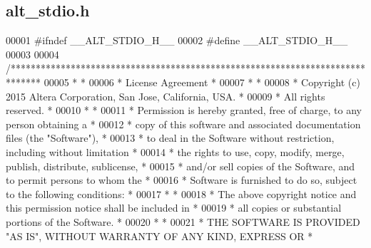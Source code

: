 \subsection{alt\+\_\+stdio.\+h}
\label{alt__stdio_8h_source}

\begin{DoxyCode}
00001 \textcolor{preprocessor}{#ifndef \_\_ALT\_STDIO\_H\_\_}
00002 \textcolor{preprocessor}{#define \_\_ALT\_STDIO\_H\_\_}
00003 
00004 \textcolor{comment}{/******************************************************************************}
00005 \textcolor{comment}{*                                                                             *}
00006 \textcolor{comment}{* License Agreement                                                           *}
00007 \textcolor{comment}{*                                                                             *}
00008 \textcolor{comment}{* Copyright (c) 2015 Altera Corporation, San Jose, California, USA.           *}
00009 \textcolor{comment}{* All rights reserved.                                                        *}
00010 \textcolor{comment}{*                                                                             *}
00011 \textcolor{comment}{* Permission is hereby granted, free of charge, to any person obtaining a     *}
00012 \textcolor{comment}{* copy of this software and associated documentation files (the "Software"),  *}
00013 \textcolor{comment}{* to deal in the Software without restriction, including without limitation   *}
00014 \textcolor{comment}{* the rights to use, copy, modify, merge, publish, distribute, sublicense,    *}
00015 \textcolor{comment}{* and/or sell copies of the Software, and to permit persons to whom the       *}
00016 \textcolor{comment}{* Software is furnished to do so, subject to the following conditions:        *}
00017 \textcolor{comment}{*                                                                             *}
00018 \textcolor{comment}{* The above copyright notice and this permission notice shall be included in  *}
00019 \textcolor{comment}{* all copies or substantial portions of the Software.                         *}
00020 \textcolor{comment}{*                                                                             *}
00021 \textcolor{comment}{* THE SOFTWARE IS PROVIDED "AS IS", WITHOUT WARRANTY OF ANY KIND, EXPRESS OR  *}

\end{DoxyCode}
